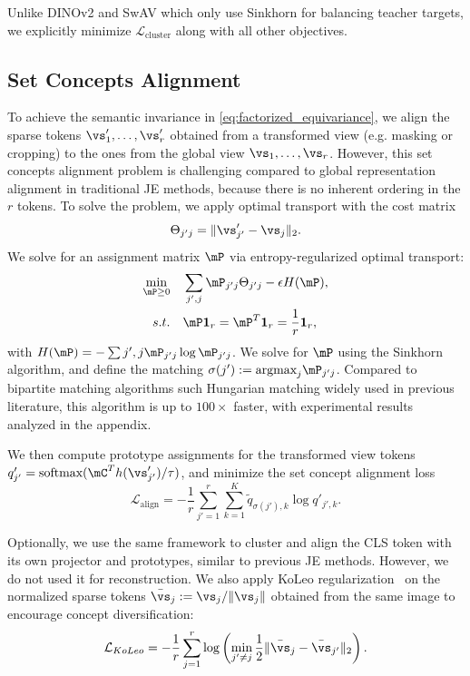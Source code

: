 Unlike DINOv2 and SwAV which only use Sinkhorn for balancing teacher targets, we explicitly minimize $\mathcal{L}_\text{cluster}$ along with all other objectives.

\subsection{Set Concepts Alignment}\label{sec-align}
To achieve the semantic invariance in \eqref{eq:factorized_equivariance}, we align the sparse tokens ${\vs'_1,\dots,\vs'_r}$ obtained from a transformed view (e.g. masking or cropping) to the ones from the global view ${\vs_1,\dots,\vs_r}$. However, this set concepts alignment problem is challenging compared to global representation alignment in traditional JE methods, because there is no inherent ordering in the $r$ tokens. To solve the problem, we apply optimal transport with the cost matrix
\begin{equation}
\Theta_{j'j} = \|\vs'_{j'} - \vs_j\|_2.
\end{equation}
We solve for an assignment matrix $\mP$ via entropy-regularized optimal transport:
\begin{align}\label{eq-match}
\min_{\mP \geq 0} & \quad \sum_{j',j} \mP_{j'j} \Theta_{j'j} - \epsilon H(\mP), \\
s.t. &  \quad
\mP\mathbf{1}_r = \mP^T\mathbf{1}_r = \frac{1}{r}\mathbf{1}_r,
\end{align}
with $H(\mP)=-\sum{j',j} \mP_{j'j}\log \mP_{j'j}$. We solve for $\mP$ using the Sinkhorn algorithm, and define the matching $\sigma(j') := \text{argmax}_j \mP_{j'j}$. Compared to bipartite matching algorithms such Hungarian matching widely used in previous literature, this algorithm is up to $100\times$ faster, with experimental results analyzed in the appendix.

We then compute prototype assignments for the transformed view tokens $q'_{j'} = \text{softmax}(\mC^T h(\vs'_{j'})/\tau)$, and minimize the set concept alignment loss
\begin{equation}\label{eq-align}
\mathcal{L}_\text{align} = -\frac{1}{r}\sum_{j'=1}^r \sum_{k=1}^K \tilde{q}_{\sigma(j'),k}\log q'_{j',k}.
\end{equation}

Optionally, we use the same framework to cluster and align the CLS token with its own projector and prototypes, similar to previous JE methods. However, we do not used it for reconstruction. We also apply KoLeo regularization~\citep{sablayrolles2018spreading} on the normalized sparse tokens $\bar{\vs}_j := \vs_j/\|\vs_j\|$ obtained from the same image to encourage concept diversification: 
\begin{equation}
    \mathcal{L}_{KoLeo} = -\frac{1}{r} \sum_{j=1}^r \log\left(\min_{j' \neq j} \frac{1}{2}\| \bar{\vs}_j - \bar{\vs}_{j'}\|_2 \right).
\end{equation}

